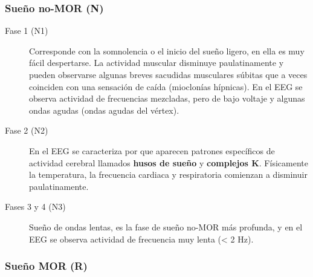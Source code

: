 

\subsubsection{Sueño no-MOR (N)}

\begin{description}
\item[Fase 1 (N1)] Corresponde con la somnolencia o el inicio del sue\~no ligero, en ella es muy 
f\'acil despertarse. La actividad muscular disminuye paulatinamente y pueden observarse algunas 
breves sacudidas musculares s\'ubitas que a veces coinciden con una sensación de ca\'ida 
(mioclon\'ias h\'ipnicas). En el EEG se observa actividad de frecuencias mezcladas, pero de bajo 
voltaje y algunas ondas agudas (ondas agudas del v\'ertex). 

\item[Fase 2 (N2)] En el EEG se caracteriza por que aparecen patrones espec\'ificos de actividad 
cerebral llamados \textbf{husos de sue\~no} y \textbf{complejos K}. F\'isicamente la 
temperatura, la frecuencia cardiaca y respiratoria comienzan a disminuir paulatinamente. 

\item[Fases 3 y 4 (N3)] Sue\~no de ondas lentas, es la fase de sue\~no no-MOR m\'as profunda, 
y en el EEG se observa actividad de frecuencia muy lenta (< 2 Hz).
\end{description}


\subsubsection{Sueño MOR (R)}

